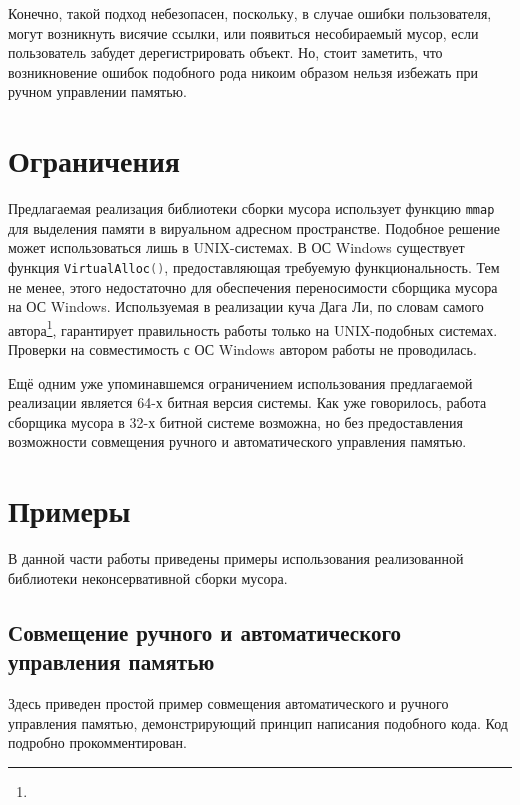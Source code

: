 Конечно, такой подход небезопасен, поскольку, в случае ошибки пользователя, могут возникнуть висячие ссылки, или появиться несобираемый мусор, если пользователь забудет дерегистрировать объект.
Но, стоит заметить, что возникновение ошибок подобного рода никоим образом нельзя избежать при ручном управлении памятью.

\section{Ограничения}

Предлагаемая реализация библиотеки сборки мусора использует функцию \lstinline[language= cpp]{mmap} для выделения памяти в
вируальном адресном пространстве. Подобное решение может использоваться лишь в UNIX-системах.
В ОС Windows существует функция \lstinline[language= cpp]{VirtualAlloc()}, предоставляющая требуемую функциональность.
Тем не менее, этого недостаточно для обеспечения переносимости сборщика мусора на ОС Windows.
Используемая в реализации куча Дага Ли, по словам самого автора\footnote{},
гарантирует правильность работы только на UNIX-подобных системах.
Проверки на совместимость с ОС Windows автором работы не проводилась.

Ещё одним уже упоминавшемся ограничением использования предлагаемой реализации является 64-х битная версия системы.
Как уже говорилось, работа сборщика мусора в 32-х битной системе возможна, но без предоставления возможности
совмещения ручного и автоматического управления памятью.

\section{Примеры}
В данной части работы приведены примеры использования реализованной библиотеки неконсервативной сборки мусора.

\subsection{Совмещение ручного и автоматического управления памятью}
Здесь приведен простой пример совмещения автоматического и ручного управления памятью,
демонстрирующий принцип написания подобного кода.
Код подробно прокомментирован.

